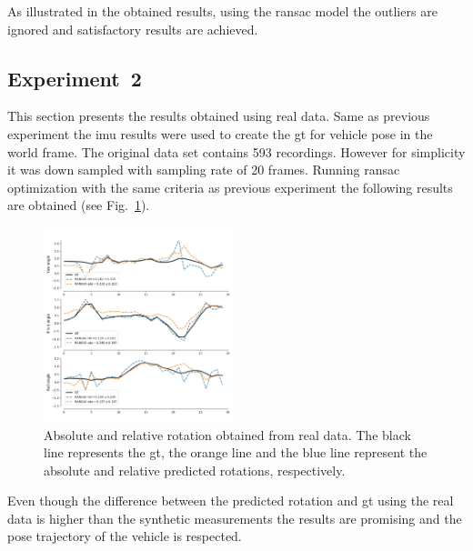 As illustrated in the obtained results, using the ransac
model the outliers are ignored and satisfactory results are achieved.

\subsection{Experiment~2}
\label{sec:exp2}
This section presents the results obtained using real data. Same as previous
experiment the \gls{imu} results were used to create the \gls{gt} for vehicle
pose in the world frame.
The original data set contains 593 recordings. However for simplicity it was
down sampled with sampling rate of 20 frames.
Running ransac optimization with the same criteria as previous experiment the
following results are obtained (see Fig.~\ref{fig:res-real}).
\begin{figure}
  \centering
  \includegraphics[width=0.49\textwidth]{./content/experiments/figures/real-res.jpeg}
  \caption{Absolute and relative rotation obtained from real data. The black
    line represents the \gls{gt}, the orange line and the blue line represent
    the absolute and relative predicted rotations, respectively.}
  \label{fig:res-real}
\end{figure}

Even though the difference between the predicted rotation and \gls{gt} using the
real data is higher than the synthetic measurements the results are
promising and the pose trajectory of the vehicle is respected.











